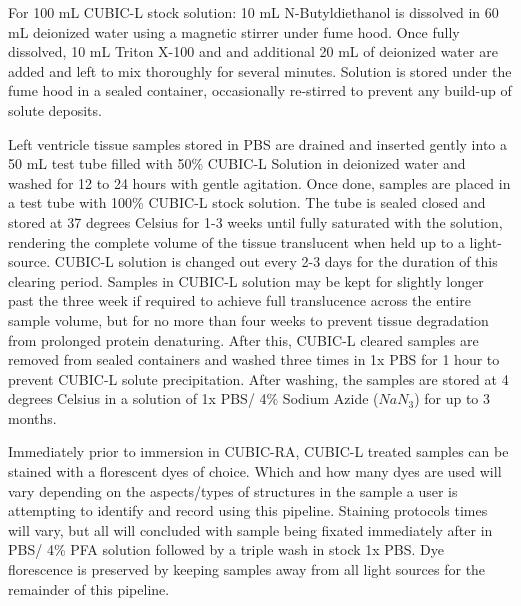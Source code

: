 For 100 mL CUBIC-L stock solution: 10 mL N-Butyldiethanol is dissolved in 60 mL deionized water using a magnetic stirrer under fume hood. Once fully dissolved, 10 mL Triton X-100 and and additional 20 mL of deionized water are added and left to mix thoroughly for several minutes. Solution is stored under the fume hood in a sealed container, occasionally re-stirred to prevent any build-up of solute deposits.

Left ventricle tissue samples stored in PBS are drained and inserted gently into a 50 mL test tube filled with 50\% CUBIC-L Solution in deionized water and washed for 12 to 24 hours with gentle agitation. Once done, samples are placed in a test tube with 100\% CUBIC-L stock solution. The tube is sealed closed and stored at 37 degrees Celsius for 1-3 weeks until fully saturated with the solution, rendering the complete volume of the tissue translucent when held up to a light-source. CUBIC-L solution is changed out every 2-3 days for the duration of this clearing period. Samples in CUBIC-L solution may be kept for slightly longer past the three week if required to achieve full translucence across the entire sample volume, but for no more than four weeks to prevent tissue degradation from prolonged protein denaturing. After this, CUBIC-L cleared samples are removed from sealed containers and washed three times in 1x PBS for 1 hour to prevent CUBIC-L solute precipitation. After washing, the samples are stored at 4 degrees Celsius in a solution of 1x PBS/ 4\% Sodium Azide (\(NaN_3\)) for up to 3 months.

Immediately prior to immersion in CUBIC-RA, CUBIC-L treated samples can be stained with a florescent dyes of choice. Which and how many dyes are used will vary depending on the aspects/types of structures in the sample a user is attempting to identify and record using this pipeline.  Staining protocols times will vary, but all will concluded with sample being fixated immediately after in PBS/ 4\% PFA solution followed by a triple wash in stock 1x PBS. Dye florescence is preserved by keeping samples away from all light sources for the remainder of this pipeline. 

